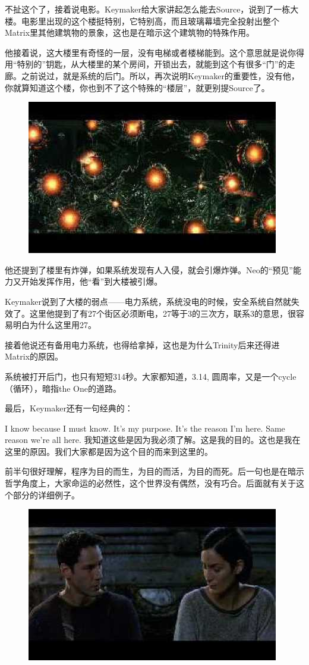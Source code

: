 \documentclass{ctexart}
\begin{document}
不扯这个了，接着说电影。Keymaker给大家讲起怎么能去Source，说到了一栋大楼。电影里出现的这个楼挺特别，它特别高，而且玻璃幕墙完全投射出整个Matrix里其他建筑物的景象，这也是在暗示这个建筑物的特殊作用。

他接着说，这大楼里有奇怪的一层，没有电梯或者楼梯能到。这个意思就是说你得用“特别的”钥匙，从大楼里的某个房间，开锁出去，就能到这个有很多“门”的走廊。之前说过，就是系统的后门。所以，再次说明Keymaker的重要性，没有他，你就算知道这个楼，你也到不了这个特殊的“楼层”，就更别提Source了。

\begin{figure}[htb]
\centering
\includegraphics[width=0.5\linewidth]{fig/read_reloaded-145}
\end{figure}

他还提到了楼里有炸弹，如果系统发现有人入侵，就会引爆炸弹。Neo的“预见”能力又开始发挥作用，他“看”到大楼被引爆。

Keymaker说到了大楼的弱点——电力系统，系统没电的时候，安全系统自然就失效了。这里他提到了有27个街区必须断电，27等于3的三次方，联系3的意思，很容易明白为什么这里用27。

接着他说还有备用电力系统，也得给拿掉，这也是为什么Trinity后来还得进Matrix的原因。

系统被打开后门，也只有短短314秒。大家都知道，3.14, 圆周率，又是一个cycle（循环），暗指the One的道路。

最后，Keymaker还有一句经典的：

I know because I must know. It’s my purpose. It’s the reason I’m here. Same reason we’re all here. 我知道这些是因为我必须了解。这是我的目的。这也是我在这里的原因。我们大家都是因为这个目的而来到这里的。

前半句很好理解，程序为目的而生，为目的而活，为目的而死。后一句也是在暗示哲学角度上，大家命运的必然性，这个世界没有偶然，没有巧合。后面就有关于这个部分的详细例子。

\begin{figure}[htb]
\centering
\includegraphics[width=0.5\linewidth]{fig/read_reloaded-146}
\end{figure}
\end{document}
